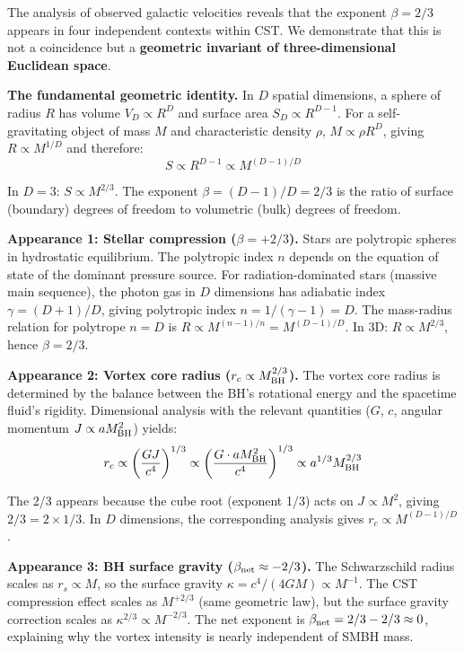 \documentclass[11pt,a4paper]{article}
\begin{document}
The analysis of observed galactic velocities reveals that the exponent $\beta = 2/3$ appears in four independent contexts within CST. We demonstrate that this is not a coincidence but a \textbf{geometric invariant of three-dimensional Euclidean space}.

\textbf{The fundamental geometric identity.} In $D$ spatial dimensions, a sphere of radius $R$ has volume $V_D \propto R^D$ and surface area $S_D \propto R^{D-1}$. For a self-gravitating object of mass $M$ and characteristic density $\rho$, $M \propto \rho R^D$, giving $R \propto M^{1/D}$ and therefore:
\begin{equation}
S \propto R^{D-1} \propto M^{(D-1)/D}
\end{equation}

In $D = 3$: $S \propto M^{2/3}$. The exponent $\beta = (D-1)/D = 2/3$ is the ratio of surface (boundary) degrees of freedom to volumetric (bulk) degrees of freedom.

\textbf{Appearance 1: Stellar compression ($\beta = +2/3$).} Stars are polytropic spheres in hydrostatic equilibrium. The polytropic index $n$ depends on the equation of state of the dominant pressure source. For radiation-dominated stars (massive main sequence), the photon gas in $D$ dimensions has adiabatic index $\gamma = (D+1)/D$, giving polytropic index $n = 1/(\gamma - 1) = D$. The mass-radius relation for polytrope $n = D$ is $R \propto M^{(n-1)/n} = M^{(D-1)/D}$. In 3D: $R \propto M^{2/3}$, hence $\beta = 2/3$.

\textbf{Appearance 2: Vortex core radius ($r_c \propto M_{\rm BH}^{2/3}$).} The vortex core radius is determined by the balance between the BH's rotational energy and the spacetime fluid's rigidity. Dimensional analysis with the relevant quantities ($G$, $c$, angular momentum $J \propto a M_{\rm BH}^2$) yields:
\begin{equation}
r_c \propto \left(\frac{G J}{c^4}\right)^{1/3} \propto \left(\frac{G \cdot a M_{\rm BH}^2}{c^4}\right)^{1/3} \propto a^{1/3} M_{\rm BH}^{2/3}
\end{equation}

The 2/3 appears because the cube root (exponent 1/3) acts on $J \propto M^2$, giving $2/3 = 2 \times 1/3$. In $D$ dimensions, the corresponding analysis gives $r_c \propto M^{(D-1)/D}$.

\textbf{Appearance 3: BH surface gravity ($\beta_{\rm net} \approx -2/3$).} The Schwarzschild radius scales as $r_s \propto M$, so the surface gravity $\kappa = c^4/(4GM) \propto M^{-1}$. The CST compression effect scales as $M^{+2/3}$ (same geometric law), but the surface gravity correction scales as $\kappa^{2/3} \propto M^{-2/3}$. The net exponent is $\beta_{\rm net} = 2/3 - 2/3 \approx 0$, explaining why the vortex intensity is nearly independent of SMBH mass.
\end{document}
